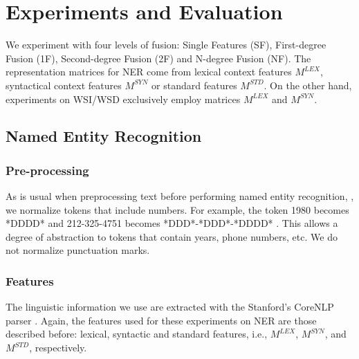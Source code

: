 \documentclass{llncs}
\begin{document}
\section{Experiments and Evaluation}


We experiment with four levels of fusion: Single Features (SF), First-degree Fusion (1F), Second-degree Fusion (2F) and N-degree Fusion (NF). The representation matrices for NER come from lexical context features $M^{LEX}$, syntactical context features $M^{SYN}$ or standard features $M^{STD}$.  On the other hand, experiments on WSI/WSD exclusively employ matrices $M^{LEX}$ and $M^{SYN}$.



\subsection{Named Entity Recognition}

\subsubsection{Pre-processing}

As is usual when preprocessing text before performing named entity recognition, \cite{RatinovR09}, we normalize tokens that include numbers. For example, the token 1980 becomes *DDDD* and 212-325-4751 becomes *DDD*-*DDD*-*DDDD* . This allows a degree of abstraction to tokens that contain years, phone
numbers, etc. We do not normalize punctuation marks.

\subsubsection{Features}
The linguistic information we use are extracted with the Stanford’s CoreNLP parser \cite{manning2014}. Again, the features used for these experiments on NER are those described before: lexical, syntactic and standard features, i.e., $M^{LEX}$, $M^{SYN}$, and $M^{STD}$, respectively. 
\end{document}
